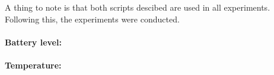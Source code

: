 A thing to note is that both scripts descibed are used in all experiments. Following this, the experiments were conducted.



\paragraph{Battery level:}




\paragraph{Temperature:}







